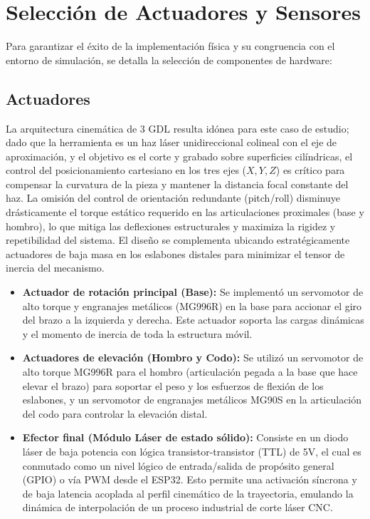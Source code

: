 \documentclass[conference,a4paper]{IEEEtran}
\begin{document}
\section{Selección de Actuadores y Sensores}
Para garantizar el éxito de la implementación física y su congruencia con el entorno de simulación, se detalla la selección de componentes de hardware:


\subsection{Actuadores}
La arquitectura cinemática de 3 GDL resulta idónea para este caso de estudio; dado que la herramienta es un haz láser unidireccional colineal con el eje de aproximación, y el objetivo es el corte y grabado sobre superficies cilíndricas, el control del posicionamiento cartesiano en los tres ejes ($X, Y, Z$) es crítico para compensar la curvatura de la pieza y mantener la distancia focal constante del haz. La omisión del control de orientación redundante (pitch/roll) disminuye drásticamente el torque estático requerido en las articulaciones proximales (base y hombro), lo que mitiga las deflexiones estructurales y maximiza la rigidez y repetibilidad del sistema. El diseño se complementa ubicando estratégicamente actuadores de baja masa en los eslabones distales para minimizar el tensor de inercia del mecanismo.

\begin{itemize}
    \item \textbf{Actuador de rotación principal (Base):} Se implementó un servomotor de alto torque y engranajes metálicos (MG996R) en la base para accionar el giro del brazo a la izquierda y derecha. Este actuador soporta las cargas dinámicas y el momento de inercia de toda la estructura móvil.
    \item \textbf{Actuadores de elevación (Hombro y Codo):} Se utilizó un servomotor de alto torque MG996R para el hombro (articulación pegada a la base que hace elevar el brazo) para soportar el peso y los esfuerzos de flexión de los eslabones, y un servomotor de engranajes metálicos MG90S en la articulación del codo para controlar la elevación distal.
    \item \textbf{Efector final (Módulo Láser de estado sólido):} Consiste en un diodo láser de baja potencia con lógica transistor-transistor (TTL) de 5V, el cual es conmutado como un nivel lógico de entrada/salida de propósito general (GPIO) o vía PWM desde el ESP32. Esto permite una activación síncrona y de baja latencia acoplada al perfil cinemático de la trayectoria, emulando la dinámica de interpolación de un proceso industrial de corte láser CNC.
\end{itemize}
\end{document}
